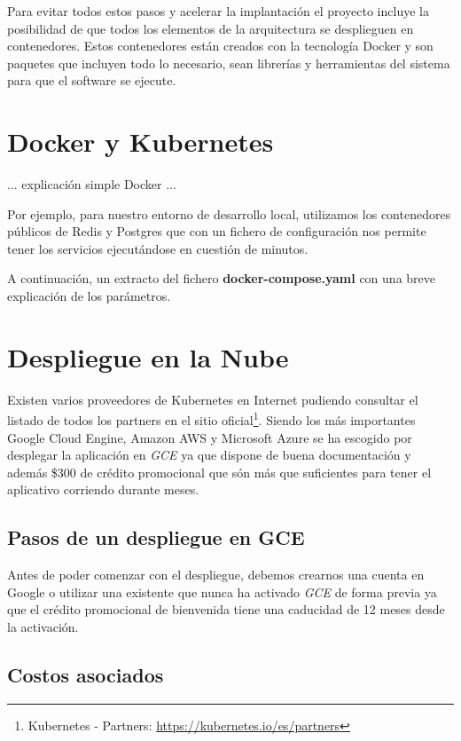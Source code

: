 \documentclass[11pt,spanish,listoffigures,listoftables]{tfgetsinf}
\begin{document}
Para evitar todos estos pasos y acelerar la implantación el proyecto incluye la posibilidad de que todos los elementos de la arquitectura se desplieguen en contenedores. Estos contenedores están creados con la tecnología Docker y son paquetes que incluyen todo lo necesario, sean librerías y herramientas del sistema para que el software se ejecute.

\section{Docker y Kubernetes}

... explicación simple Docker ...

Por ejemplo, para nuestro entorno de desarrollo local, utilizamos los contenedores públicos de Redis y Postgres que con un fichero de configuración nos permite tener los servicios ejecutándose en cuestión de minutos.

A continuación, un extracto del fichero \textbf{docker-compose.yaml} con una breve explicación de los parámetros.




\section{Despliegue en la Nube}

Existen varios proveedores de Kubernetes en Internet pudiendo consultar el listado de todos los partners en el sitio oficial\footnote{Kubernetes - Partners: \url{https://kubernetes.io/es/partners}}. Siendo los más importantes Google Cloud Engine, Amazon AWS y Microsoft Azure se ha escogido por desplegar la aplicación en \textit{GCE} ya que  dispone de buena documentación y además \$300 de crédito promocional que són más que suficientes para tener el aplicativo corriendo durante meses.

\subsection{Pasos de un despliegue en GCE}

Antes de poder comenzar con el despliegue, debemos crearnos una cuenta en Google o utilizar una existente que nunca ha activado \textit{GCE} de forma previa ya que el crédito promocional de bienvenida tiene una caducidad de 12 meses desde la activación.




\subsection{Costos asociados}
\end{document}
